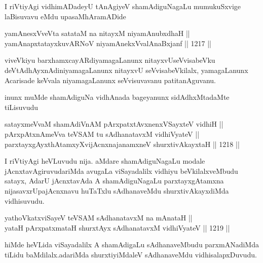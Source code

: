 \begin{center}
I riVtiyAgi vidhimADadeyU tAnAgiyeV shamAdiguNagaLu mumukuSxvige laBisuvavu eMdu upasaMhAramADide
\end{center}


\begin{shl}
yamAnesxVveVta satataM na nitayxM niyamAnubxdhaH || \\
yamAnapxtatayxkuvARNoV niyamAnekxVvalAnaBxjanf \hfill || 1217 ||  
\end{shl}

\begin{artha}
viveVkiyu barxhamxcayARdiyamagaLanunx nitayxvUseVvisabeVku deVtAdhAyxnAdiniyamagaLanunx nitayxvU seVvisabeVkilalx, yamagaLanunx Acarisade keVvala niyamagaLanunx seVvisuvavanu patitanAguvanu.
\end{artha}

\begin{center}
inunx muMde shamAdiguNa vidhAnada bageyanunx sidAdhxMtadaMte tiLisuvudu
\end{center}


\begin{shl}
satayxmeVvaM shamAdiVnAM pArxpatxtAvxnenxVSayxteV vidhiH || \\
pArxpAtxnAmeVva teVSAM tu sAdhanatavxM vidhiVyateV || \\
parxtayxgAyxthAtamxyXvijAcnxnajanamxneV shurxtivAkayxtaH \hfill || 1218 ||  
\end{shl}

\begin{artha}
I riVtiyAgi heVLuvudu nija. aMdare shamAdiguNagaLu modale jAcnxtavAgiruvudariMda avugaLa viSayadalilx vidhiyu beVkilalxveMbudu satayx, AdarU jAcnxtavAda A shamAdiguNagaLu parxtayxgAtamxna nijasavxrUpajAcnxnavu huTaTxlu sAdhanaveMdu shurxtivAkayxdiMda vidhisuvudu.
\end{artha}


\begin{shl}
yathoVkatxviSayeV teVSAM sAdhanatavxM na mAnataH || \\
yataH pArxpatxmataH shurxtAyx sAdhanatavxM vidhiVyateV \hfill || 1219 ||  
\end{shl}

\begin{artha}
hiMde heVLida viSayadalilx A shamAdigaLu sAdhanaveMbudu parxmANadiMda tiLidu baMdilalx.adariMda shurxtiyiMdaleV sAdhanaveMdu vidhisalapxDuvudu.
\end{artha}

